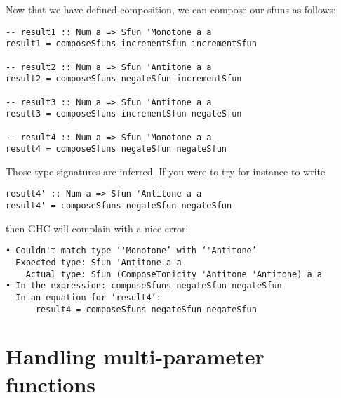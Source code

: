 \documentclass[11pt]{article}
\begin{document}
Now that we have defined composition, we can compose our sfuns as follows:

\begin{verbatim}
-- result1 :: Num a => Sfun 'Monotone a a
result1 = composeSfuns incrementSfun incrementSfun

-- result2 :: Num a => Sfun 'Antitone a a
result2 = composeSfuns negateSfun incrementSfun

-- result3 :: Num a => Sfun 'Antitone a a
result3 = composeSfuns incrementSfun negateSfun

-- result4 :: Num a => Sfun 'Monotone a a
result4 = composeSfuns negateSfun negateSfun

\end{verbatim}

Those type signatures are inferred. If you were to try for instance to write

\begin{verbatim}
result4' :: Num a => Sfun 'Antitone a a
result4' = composeSfuns negateSfun negateSfun
\end{verbatim}

then GHC will complain with a nice error:

\begin{verbatim}
• Couldn't match type ‘'Monotone’ with ‘'Antitone’
  Expected type: Sfun 'Antitone a a
    Actual type: Sfun (ComposeTonicity 'Antitone 'Antitone) a a
• In the expression: composeSfuns negateSfun negateSfun
  In an equation for ‘result4’:
      result4 = composeSfuns negateSfun negateSfun
\end{verbatim}


\section{Handling multi-parameter functions}
\label{sec:orgda20bb4}
\end{document}
